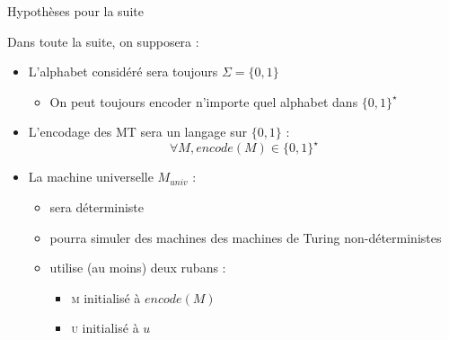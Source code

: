 
\begingroup

\begin{frame}{Hypothèses pour la suite}

  \begin{block}{Dans toute la suite, on supposera :}
    \begin{itemize}
    \item L'alphabet considéré sera toujours $\Sigma = \{0,1\}$
      \begin{itemize}
      \item On peut toujours encoder n'importe quel alphabet dans $\{0,1\}^\star$
      \end{itemize}
    \item L'encodage des MT sera un langage sur $\{0,1\}$ : $$\forall M, \mathit{encode}(M) \in \{0,1\}^\star$$ 
    \item La machine universelle $M_{univ}$ :
      \begin{itemize}
      \item sera déterministe
      \item pourra simuler des machines des machines de Turing non-déterministes
      \item utilise (au moins) deux rubans : 
        \begin{itemize}
        \item \textsc{m} initialisé à $\mathit{encode}(M)$ 
        \item \textsc{u} initialisé à $u$ 
        \end{itemize}
      \end{itemize}
    \end{itemize}
  \end{block}

\end{frame}

\endgroup
\endinput
